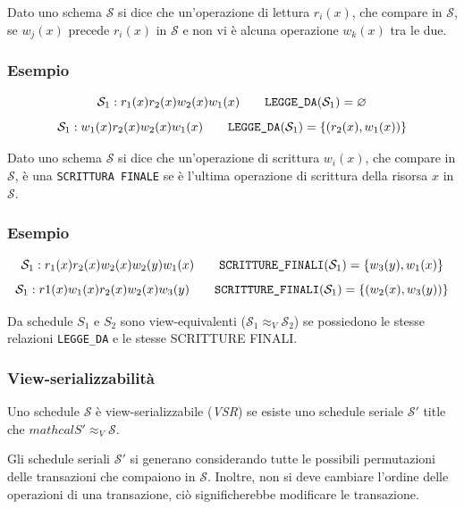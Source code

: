 \documentclass[oneside,a4paper,11pt]{book}
\theoremstyle{italicstyle}
\theoremstyle{normStyle}
\begin{document}
\begin{tcolorbox}[title = {Legge da}]
Dato uno schema $\mathcal{S}$ si dice che un'operazione di lettura $r_i(x)$,
che compare in $\mathcal{S}$, se $w_j(x)$ precede $r_i(x)$ in $\mathcal{S}$
e non vi è alcuna operazione $w_k(x)$ tra le due.
\end{tcolorbox}
\subsubsection{Esempio}
\[
  \mathcal{S}_1:r_1(x)r_2(x)w_2(x)w_1(x)\qquad\verb|LEGGE_DA|(\mathcal{S}_1)=\varnothing
\]
\[
  \mathcal{S}_1:w_1(x)r_2(x)w_2(x)w_1(x)\qquad\verb|LEGGE_DA|(\mathcal{S}_1)=\{(r_2(x),w_1(x))\}
\]

\begin{tcolorbox}[title = {Scritture finali}]
  Dato uno schema $\mathcal{S}$ si dice che un'operazione di scrittura $w_i(x)$,
  che compare in $\mathcal{S}$, è una \verb|SCRITTURA FINALE| se è l'ultima operazione di scrittura della risorsa $x$
  in $\mathcal{S}$.
  \end{tcolorbox}
  \subsubsection{Esempio}
  \[
    \mathcal{S}_1:r_1(x)r_2(x)w_2(x)w_2(y)w_1(x)\qquad\verb|SCRITTURE_FINALI|(\mathcal{S}_1)=\{w_3(y),w_1(x)\}
  \]
  \[
    \mathcal{S}_1:r1(x)w_1(x)r_2(x)w_2(x)w_3(y)\qquad\verb|SCRITTURE_FINALI|(\mathcal{S}_1)=\{(w_2(x),w_3(y))\}
  \]

\begin{tcolorbox}[title = {View-equivalenza}]
  Da schedule $S_1$ e $S_2$ sono view-equivalenti ($\mathcal{S}_1 \approx_V \mathcal{S}_2$) se 
  possiedono le stesse relazioni \verb|LEGGE_DA| e le stesse SCRITTURE FINALI.
\end{tcolorbox}
\subsubsection{View-serializzabilità}
\begin{tcolorbox}[title = {View-serializzabilità}]
Uno schedule $\mathcal{S}$ è view-serializzabile (\textit{VSR}) se esiste uno schedule 
seriale $\mathcal{S}'$ title che $mathcal{S}' \approx_V \mathcal{S}$.
\end{tcolorbox}
Gli schedule seriali $\mathcal{S}'$ si generano considerando tutte le possibili 
permutazioni delle transazioni che compaiono in $\mathcal{S}$. Inoltre, non si deve 
cambiare l'ordine delle operazioni di una transazione, ciò significherebbe modificare le transazione.
\end{document}
